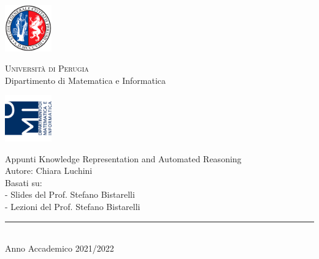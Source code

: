 
\thispagestyle{empty} %

	\noindent %
	\includegraphics[width=0.15\textwidth]{img/logoUniPg}
	\begin{minipage}[b]{0.7\textwidth}
		\centering
		{\Large{\textsc{Universit{\`a} di Perugia}}}\\
		\vspace{0.4 em}
		{\large {Dipartimento di Matematica e Informatica}}
		\vspace{0.6 em}
	\end{minipage}%
	\includegraphics[width=0.15\textwidth]{img/logoDMI}
	
	\vspace{8 em}

	\begin{center}
		

	
		{\Huge{Appunti Knowledge Representation and Automated Reasoning }}\\
		\vspace{2 em}
		{\large { Autore: Chiara Luchini}}\\
		\vspace{5 em}
		{\large {Basati su:}}\\
		{\large {- Slides del Prof. Stefano Bistarelli}}\\
		{\large {- Lezioni del Prof. Stefano Bistarelli}}\\
		
	
	

		
		\vspace{6 em}
		\vfill
		
	{\rule{380pt}{.4pt}}\\
		\vspace{1.2 em}
		\large{{Anno Accademico 2021/2022}}
		
		
		
		
	\end{center}

